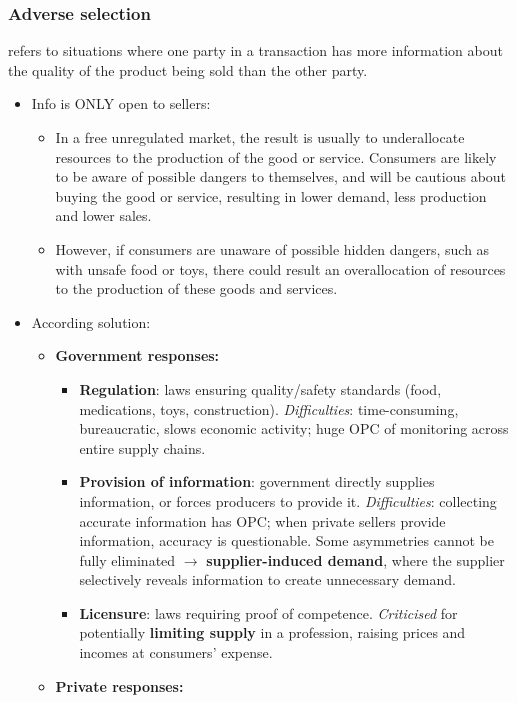 \subsubsection*{Adverse selection}
 refers to situations where one party in a transaction has more information about the quality of the product being sold than the other party.
\begin{itemize}
  \item Info is ONLY open to sellers:
  \begin{itemize}
    \item In a free unregulated market, the result is usually to underallocate resources to the production of the good or service. Consumers are likely to be aware of possible dangers to themselves, and will be cautious about buying the good or service, resulting in lower demand, less production and lower sales.
    \item However, if consumers are unaware of possible hidden dangers, such as with unsafe food or toys, there could result an overallocation of resources to the production of these goods and services.
  \end{itemize}
  \item According solution:
  \begin{itemize}
      \item \textbf{Government responses:}
      \begin{itemize}
        \item \textbf{Regulation}: laws ensuring quality/safety standards (food, medications, toys, construction). \textit{Difficulties}: time-consuming, bureaucratic, slows economic activity; huge OPC of monitoring across entire supply chains.
        \item \textbf{Provision of information}: government directly supplies information, or forces producers to provide it. \textit{Difficulties}: collecting accurate information has OPC; when private sellers provide information, accuracy is questionable. Some asymmetries cannot be fully eliminated $\to$ \textbf{supplier-induced demand}, where the supplier selectively reveals information to create unnecessary demand.
        \item \textbf{Licensure}: laws requiring proof of competence. \textit{Criticised} for potentially \textbf{limiting supply} in a profession, raising prices and incomes at consumers' expense.
      \end{itemize}
      \item \textbf{Private responses:}

\end{itemize}
\end{itemize}
